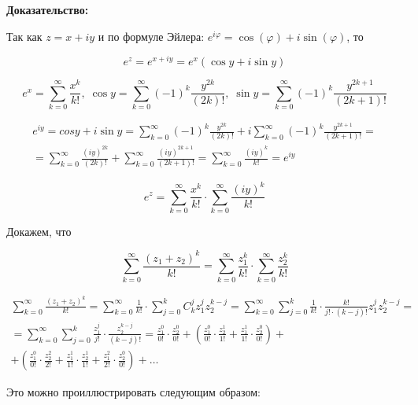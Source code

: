 \documentclass[a4paper,12pt]{article} %
\newcommand{\ryad}{\sum\limits^{\infty}_{k = 0}}
\begin{document}
\textbf{Доказательство:}

Так как $z = x + iy$ и по формуле Эйлера: $e^{i \varphi} = \cos(\varphi) + i \sin(\varphi)$, то 

$$
e^z = e^{x + iy} = e^x \left( \cos y + i \sin y \right)
$$

$$
e^x = \ryad \frac{x^k}{k!}, \; \cos y = \ryad (-1)^k \frac{y^{2k}}{(2k)!}, \; \sin y = \ryad (-1)^k \frac{y^{2k + 1}}{(2k + 1)!}
$$

\begin{multline*}
e^{iy} = cos y + i \sin y = \ryad (-1)^k \frac{y^{2k}}{(2k)!} + i \ryad (-1)^k \frac{y^{2k + 1}}{(2k + 1)!} =  \\ = \ryad \frac{(iy)^{2k}}{(2k)!} + \ryad \frac{(iy)^{2k + 1}}{(2k + 1)!} = \ryad \frac{(iy)^{k}}{k!} = e^{iy}
\end{multline*}

$$
e^z = \ryad \frac{x^k}{k!} \cdot \ryad \frac{(iy)^{k}}{k!}
$$

Докажем, что

$$
\ryad \frac{(z_1 + z_2)^k}{k!} = \ryad \frac{z_1^k}{k!} \cdot \ryad \frac{z_2^k}{k!}
$$

\begin{multline*}
\ryad \frac{(z_1 + z_2)^k}{k!} = \ryad \frac{1}{k!} \cdot \sum\limits_{j = 0}^k C_k^j z_1^j z_2^{k - j} = \ryad  \sum\limits_{j = 0}^k \frac{1}{k!} \cdot \frac{k!}{j! \cdot (k - j)!} z_1^j z_2^{k - j} = \\ = \ryad  \sum\limits_{j = 0}^k \frac{z_1^j}{j!} \cdot \frac{z_2^{k - j}}{(k - j)!} = \frac{z_1^0}{0!} \cdot \frac{z_2^0}{0!} + \left(\frac{z_1^0}{0!} \cdot \frac{z_2^1}{1!} + \frac{z_1^1}{1!} \cdot \frac{z_2^0}{0!} \right) + \\ + \left( \frac{z_1^0}{0!} \cdot \frac{z_2^2}{2!} + \frac{z_1^1}{1!} \cdot \frac{z_2^1}{1!} + \frac{z_1^2}{2!} \cdot \frac{z_2^0}{0!} \right) + \ldots
\end{multline*}

Это можно проиллюстрировать следующим образом:

\begin{table}[h!]
\centering
{}
\end{table}
\end{document}
